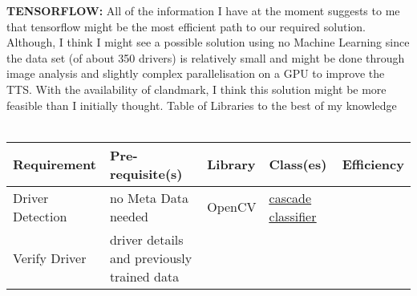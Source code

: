 \documentclass{article}
\begin{document}
\textbf{TENSORFLOW:}
    All of the information I have at the moment suggests to me that tensorflow might be the most efficient path to our required 
    solution. Although, I think I might see a possible solution using no Machine Learning since the data set (of about 350 drivers)
    is relatively small and might be done through image analysis and slightly complex parallelisation on a GPU to improve the TTS. 
    With the availability of clandmark, I think this solution might be more feasible than I initially thought.
\newpage
\Large{Table of Libraries to the best of my knowledge}
\\ \vspace{1cm} \\
\begin{tabulary}{0.8\textwidth}{LLL}
    \hline
    Requirement & Pre-requisite(s) & Library & Class(es) & Efficiency \\
    \hline  
    Driver Detection & no Meta Data needed & OpenCV & \href{http://docs.opencv.org/2.4/doc/tutorials/objdetect/cascade_classifier/cascade_classifier.html}{\underline{cascade classifier}} & \\ \hline
    Verify Driver & driver details and previously trained data & & & \\
    \hline
  \end{tabulary}
\end{document}
